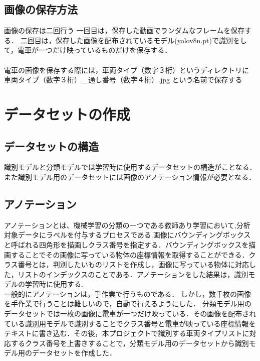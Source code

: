 \subsection{画像の保存方法}
画像の保存は二回行う
一回目は，保存した動画でランダムなフレームを保存する．
二回目は，保存した画像を配布されているモデル(yolov8n.pt)で識別をして，電車が一つだけ映っているものだけを保存する．\\
\\
電車の画像を保存する際には，車両タイプ（数字３桁）というディレクトリに\\
車両タイプ（数字３桁）＿通し番号（数字４桁）.jpg    という名前で保存する
\section{データセットの作成}
\subsection{データセットの構造}
識別モデルと分類モデルでは学習時に使用するデータセットの構造がことなる．また識別モデル用のデータセットには画像のアノテーション情報が必要となる．
\subsection{アノテーション}
アノテーションとは、機械学習の分類の一つである教師あり学習において,分析対象データにラベルを付与するプロセスである.画像にバウンディングボックスと呼ばれる四角形を描画しクラス番号を指定する．バウンディングボックスを描画することでその画像に写っている物体の座標情報を取得することができる．クラス番号とは，判別したいものリストを作成し，画像に写っている物体に対応した，リストのインデックスのことである．アノテーションをした結果は，識別モデルの学習時に使用する.\\
一般的にアノテーションは，手作業で行うものである．
しかし，数千枚の画像を手作業で行うことは難しいので，自動で行えるようにした．
分類モデル用のデータセットでは一枚の画像に電車が一つだけ映っている．その画像を配布されている識別用モデルで識別することでクラス番号と電車が映っている座標情報をテキストに書き込む．その後，本プロジェクトで識別する車両タイプリストに対応するクラス番号を上書きすることで，分類モデル用のデータセットから識別モデル用のデータセットを作成した．


